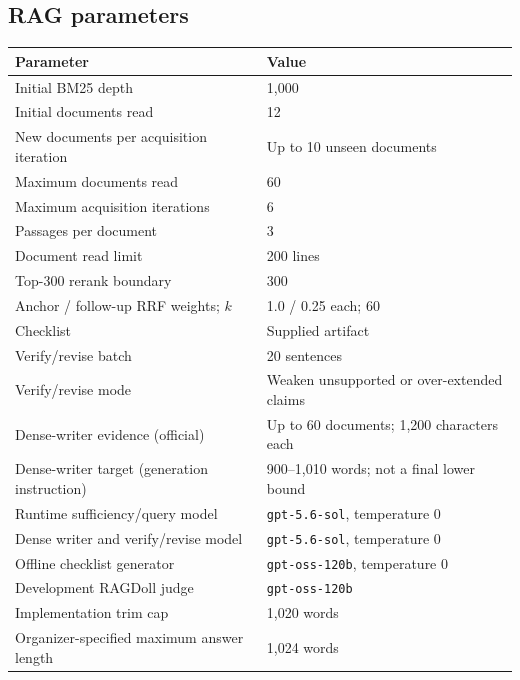 \subsection{RAG parameters}

\noindent\begin{minipage}{\columnwidth}
\centering
{}
\label{tab:appendix-rag-parameters}
\centering
\small
\setlength{\tabcolsep}{6pt}
\renewcommand{\arraystretch}{1.08}
\begin{tabularx}{\columnwidth}{@{}>{\raggedright\arraybackslash}p{}X@{}}
\toprule
Parameter & Value \\
\midrule
Initial BM25 depth & 1,000 \\
Initial documents read & 12 \\
New documents per acquisition iteration & Up to 10 unseen documents \\
Maximum documents read & 60 \\
Maximum acquisition iterations & 6 \\
Passages per document & 3 \\
Document read limit & 200 lines \\
Top-300 rerank boundary & 300 \\
Anchor / follow-up RRF weights; $k$ & 1.0 / 0.25 each; 60 \\
Checklist & Supplied artifact \\
Verify/revise batch & 20 sentences \\
Verify/revise mode & Weaken unsupported or over-extended claims \\
Dense-writer evidence (official) & Up to 60 documents; 1,200 characters each \\
Dense-writer target (generation instruction) & 900--1,010 words; not a final lower bound \\
Runtime sufficiency/query model & \texttt{gpt-5.6-sol}, temperature 0 \\
Dense writer and verify/revise model & \texttt{gpt-5.6-sol}, temperature 0 \\
Offline checklist generator & \texttt{gpt-oss-120b}, temperature 0 \\
Development RAGDoll judge & \texttt{gpt-oss-120b} \\
Implementation trim cap & 1,020 words \\
Organizer-specified maximum answer length & 1,024 words \\
\bottomrule
\end{tabularx}
\end{minipage}
\par\vspace{0.6\baselineskip}

